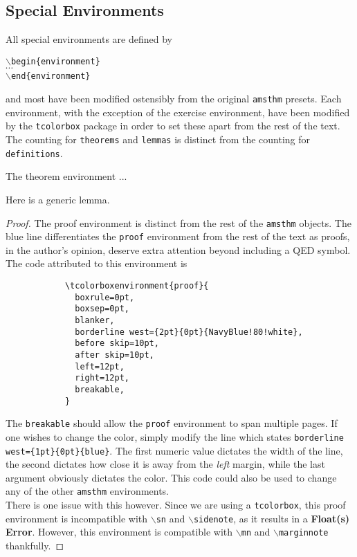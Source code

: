 \documentclass[10pt]{article}
\begin{document}
	


	\subsection{Special Environments}\label{Sub:Special}
	All special environments are defined by
	\begin{center}
	\texttt{$\backslash$begin\{environment\}}\\
	$\cdots$\\
	\texttt{$\backslash$end\{environment\}}
	\end{center}
	and most have been modified ostensibly from the original \texttt{amsthm} presets. Each environment, with the exception of the exercise environment, have been modified by the \texttt{tcolorbox} package in order to set these apart from the rest of the text. The counting for \texttt{theorems} and \texttt{lemmas} is distinct from the counting for \texttt{definitions}.
	\begin{theorem}
		The theorem environment ...

	\end{theorem}
	\begin{lemma}
		Here is a generic lemma.
	\end{lemma}
	\begin{proof}
		The proof environment is distinct from the rest of the \texttt{amsthm} objects. The blue line differentiates the \texttt{proof} environment from the rest of the text as proofs, in the author's opinion, deserve extra attention beyond including a QED symbol. The code attributed to this environment is
		\begin{verbatim}
			\tcolorboxenvironment{proof}{
			  boxrule=0pt,
			  boxsep=0pt,
			  blanker,
			  borderline west={2pt}{0pt}{NavyBlue!80!white},
			  before skip=10pt,
			  after skip=10pt,
			  left=12pt,
			  right=12pt,
			  breakable,
			}
		\end{verbatim}
		The \texttt{breakable} should allow the \texttt{proof} environment to span multiple pages. If one wishes to change the color, simply modify the line which states \texttt{borderline west=\{1pt\}\{0pt\}\{blue\}}. The first numeric value dictates the width of the line, the second dictates how close it is away from the \textit{left} margin, while the last argument obviously dictates the color. This code could also be used to change any of the other \texttt{amsthm} environments.\\

		There is one issue with this however. Since we are using a \texttt{tcolorbox}, this proof environment is incompatible with \texttt{$\backslash$sn} and \texttt{$\backslash$sidenote}, as it results in a \textbf{Float(s) Error}. However, this environment is compatible with \texttt{$\backslash$mn} and \texttt{$\backslash$marginnote} thankfully.
	\end{proof}
\end{document}
